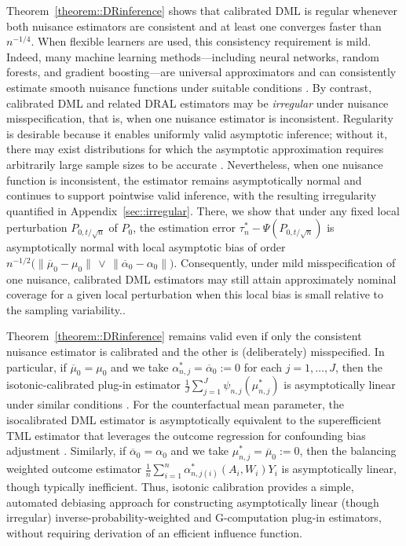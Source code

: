 \documentclass[11pt]{article}
\theoremstyle{plain}
\begin{document}
Theorem~\ref{theorem::DRinference} shows that calibrated DML is regular whenever both nuisance estimators are consistent and at least one converges faster than \(n^{-1/4}\). When flexible learners are used, this consistency requirement is mild. Indeed, many machine learning methods---including neural networks, random forests, and gradient boosting---are universal approximators and can consistently estimate smooth nuisance functions under suitable conditions \citep{hornik1989multilayer, anthony2009neural, zhang2005boosting, biau2008consistency}. By contrast, calibrated DML and related DRAL estimators \citep{benkeser2017doubly,dukes2024doubly,bonvini2024doubly} may be \emph{irregular} under nuisance misspecification, that is, when one nuisance estimator is inconsistent. Regularity is desirable because it enables uniformly valid asymptotic inference; without it, there may exist distributions for which the asymptotic approximation requires arbitrarily large sample sizes to be accurate \citep{LeebModelSelect2005}. Nevertheless, when one nuisance function is inconsistent, the estimator remains asymptotically normal and continues to support pointwise valid inference, with the resulting irregularity quantified in Appendix~\ref{sec::irregular}. There, we show that under any fixed local perturbation \(P_{0,t/\sqrt{n}}\) of \(P_0\), the estimation error \(\tau_n^*-\Psi(P_{0,t/\sqrt{n}})\) is asymptotically normal with local asymptotic bias of order \(n^{-1/2}\big(\|\overline{\mu}_0-\mu_0\| \,\vee\, \|\overline{\alpha}_0-\alpha_0\|\big)\). Consequently, under mild misspecification of one nuisance, calibrated DML estimators may still attain approximately nominal coverage for a given local perturbation when this local bias is small relative to the sampling variability..
 

 
{\color{purple} Theorem~\ref{theorem::DRinference} remains valid even if only the consistent
nuisance estimator is calibrated and the other is (deliberately) misspecified.}
In particular, if \(\overline{\mu}_0=\mu_0\) and we take
\(\alpha_{n,j}^*=\overline{\alpha}_0:=0\) for each \(j=1,\ldots,J\), then the
isotonic-calibrated plug-in estimator
\(\frac{1}{J}\sum_{j=1}^J \psi_{n,j}(\mu_{n,j}^*)\) is asymptotically linear
under similar conditions \citep{van2025automatic}. For the counterfactual mean
parameter, the isocalibrated DML estimator is asymptotically equivalent to the
superefficient TML estimator that leverages the outcome regression for
confounding bias adjustment \citep{benkeser2020nonparametric}. Similarly, if
\(\overline{\alpha}_0=\alpha_0\) and we take
\(\mu_{n,j}^*=\overline{\mu}_0:=0\), then the balancing weighted outcome
estimator \(\frac{1}{n}\sum_{i=1}^n \alpha_{n,j(i)}^*(A_i,W_i)Y_i\) is
asymptotically linear, though typically inefficient. Thus, isotonic
calibration provides a simple, automated debiasing approach for constructing
asymptotically linear (though irregular) inverse-probability-weighted and
G-computation plug-in estimators, without requiring derivation of an efficient
influence function.
\end{document}
